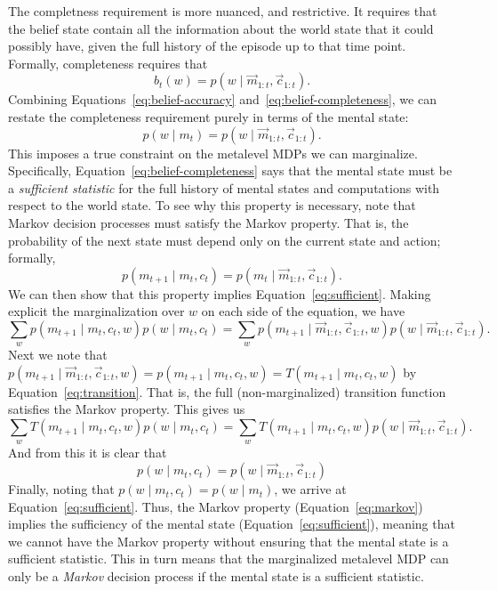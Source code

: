 The completness requirement is more nuanced, and restrictive. It requires that the belief state contain all the information about the world state that it could possibly have, given the full history of the episode up to that time point. Formally, completeness requires that
\begin{equation}\label{eq:belief-completeness}
  b_t(w) = p(w \mid \vec{m}_{1:t}, \vec{c}_{1:t}).
\end{equation}
Combining Equations~\ref{eq:belief-accuracy} and~\ref{eq:belief-completeness}, we can restate the completeness requirement purely in terms of the mental state:
\begin{equation}\label{eq:sufficient}
  p(w \mid m_t) = p(w \mid \vec{m}_{1:t}, \vec{c}_{1:t}).
\end{equation}
This imposes a true constraint on the metalevel MDPs we can marginalize. Specifically, Equation~\ref{eq:belief-completeness} says that the mental state must be a \emph{sufficient statistic} for the full history of mental states and computations with respect to the world state. To see why this property is necessary, note that Markov decision processes must satisfy the Markov property. That is, the probability of the next state must depend only on the current state and action; formally,
\begin{equation}\label{eq:markov}
  p(m_{t+1} \mid m_t, c_t) = p(m_t \mid \vec{m}_{1:t}, \vec{c}_{1:t}).
\end{equation}
We can then show that this property implies Equation~\ref{eq:sufficient}.
Making explicit the marginalization over $w$ on each side of the equation, we have
\begin{equation}
  \sum_w p(m_{t+1} \mid m_t, c_t, w) p(w \mid m_t, c_t) =
  \sum_w p(m_{t+1} \mid \vec{m}_{1:t}, \vec{c}_{1:t}, w) p(w \mid \vec{m}_{1:t}, \vec{c}_{1:t}).
\end{equation}
Next we note that $p(m_{t+1} \mid \vec{m}_{1:t}, \vec{c}_{1:t}, w) = p(m_{t+1} \mid m_t, c_t, w) = T(m_{t+1} \mid m_t, c_t, w)$ by Equation~\ref{eq:transition}. That is, the full (non-marginalized) transition function satisfies the Markov property. This gives us
\begin{equation}
  \sum_w T(m_{t+1} \mid m_t, c_t, w) p(w \mid m_t, c_t) =
  \sum_w T(m_{t+1} \mid m_t, c_t, w) p(w \mid \vec{m}_{1:t}, \vec{c}_{1:t}).
\end{equation}
And from this it is clear that 
%
\begin{equation}
  p(w \mid m_t, c_t) = p(w \mid \vec{m}_{1:t}, \vec{c}_{1:t})
\end{equation}
%
Finally, noting that $p(w \mid m_t, c_t) = p(w \mid m_t)$, we arrive at Equation~\ref{eq:sufficient}. Thus, the Markov property (Equation~\ref{eq:markov}) implies the sufficiency of the mental state (Equation~\ref{eq:sufficient}), meaning that we cannot have the Markov property without ensuring that the mental state is a sufficient statistic. This in turn means that the marginalized metalevel MDP can only be a \emph{Markov} decision process if the mental state is a sufficient statistic.


